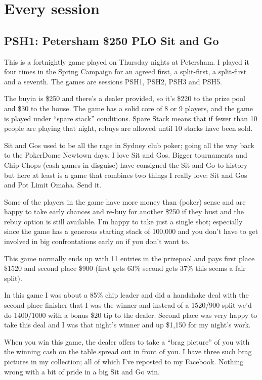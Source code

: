 \chapter{Every session}

\section*{PSH1: Petersham \$250 PLO Sit and Go}

This is a fortnightly game played on Thursday nights at Petersham.
I played it four times in the Spring Campaign for an agreed first,
a split-first, a split-first and a seventh. The games are sessions
PSH1, PSH2, PSH3 and PSH5.

The buyin is \$250 and there's a dealer provided, so it's \$220 to
the prize pool and \$30 to the house. The game has a solid core of
8 or 9 players, and the game is played under ``spare stack''
conditions. Spare Stack means that if fewer than 10 people are playing
that night, rebuys are allowed until 10 stacks have been sold.

Sit and Gos used to be all the rage in Sydney club poker; going all
the way back to the PokerDome Newtown days. I love Sit and Gos.
Bigger tournaments and Chip Chops (cash games in disguise) have
consigned the Sit and Go to history but here at least is a game that
combines two things I really love: Sit and Gos and Pot Limit
Omaha. Send it.

Some of the players in the game have more money than (poker) sense and
are happy to take early chances and re-buy for another \$250 if they
bust and the rebuy option is still available. I'm happy to take just a
single shot; especially since the game has a generous starting stack
of 100,000 and you don't have to get involved in big confrontations
early on if you don't want to.

This game normally ends up with 11 entries in the prizepool and pays
first place \$1520 and second place \$900 (first gets 63\% second gets
37\% this seems a fair split).

In this game I was about a 85\% chip leader and did a handshake deal
with the second place finisher that I was the winner and instead of a
1520/900 split we'd do 1400/1000 with a bonus \$20 tip to the
dealer. Second place was very happy to take this deal and I was that
night's winner and up \$1,150 for my night's work.

When you win this game, the dealer offers to take a ``brag picture''
of you with the winning cash on the table spread out in front of
you. I have three such brag pictures in my collection; all of which
I've reposted to my Facebook. Nothing wrong with a bit of pride in a
big Sit and Go win.


